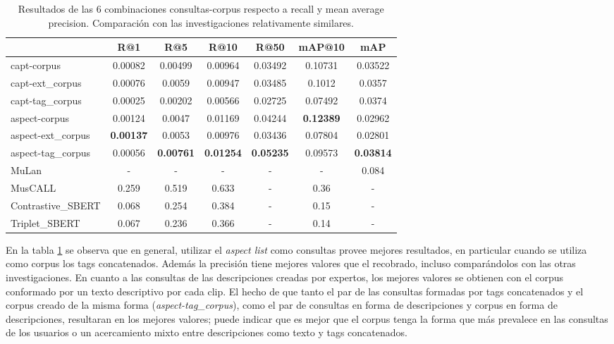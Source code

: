 \begin{table}[h]
    \footnotesize
    \centering
    \begin{tabular} { | l | c | c | c | c | c | c | }
    \hline
                      &   R@1           &   R@5   &   R@10          &   R@50          & mAP@10          &   mAP   \\ 
    \hline
    capt-corpus       & 0.00082         & 0.00499 & 0.00964         & 0.03492         & 0.10731         & 0.03522 \\
    capt-ext\_corpus   & 0.00076         & 0.0059  & 0.00947         & 0.03485         & 0.1012          & 0.0357  \\ 
    capt-tag\_corpus   & 0.00025         & 0.00202 & 0.00566         & 0.02725         & 0.07492         & 0.0374  \\ 
    aspect-corpus     & 0.00124         & 0.0047  & 0.01169         & 0.04244         &\textbf{0.12389} & 0.02962 \\ 
    aspect-ext\_corpus &\textbf{0.00137} & 0.0053  & 0.00976         & 0.03436         & 0.07804         & 0.02801 \\ 
    aspect-tag\_corpus & 0.00056 &\textbf{0.00761} &\textbf{0.01254} &\textbf{0.05235} & 0.09573 &\textbf{0.03814} \\ 
    \hline
MuLan \cite{Huang2022MuLanAJ}&    -     &    -    &         -       &        -        &        -        & 0.084   \\ 
MusCALL \cite{Manco2022ContrastiveAL}&  0.259  &  0.519  &  0.633   &        -        &  0.36           &   -     \\ 
Contrastive\_SBERT \cite{Doh2022TowardUT}& 0.068&  0.254  &  0.384   &        -        &  0.15           &   -     \\ 
Triplet\_SBERT \cite{Doh2022TowardUT} &  0.067  &  0.236  &  0.366   &        -        &  0.14           &   -     \\ 
    \hline
    \end{tabular}
    \caption{Resultados de las 6 combinaciones consultas-corpus	respecto a recall y mean average precision. Comparación con las     investigaciones relativamente similares.}
    \label{tab:results}
\end{table}

En la tabla \ref{tab:results} se observa que en general, utilizar el \textit{aspect list} como consultas provee mejores resultados, en particular cuando se utiliza como corpus los tags concatenados. Además la precisión tiene mejores valores que el recobrado, incluso comparándolos con las otras investigaciones.
En cuanto a las consultas de las descripciones creadas por expertos, los mejores valores se obtienen con el corpus conformado por un texto descriptivo por cada clip. El hecho de que tanto el par de las consultas formadas por tags concatenados y el corpus creado de la misma forma (\textit{aspect-tag\_corpus}), como el par de consultas en forma de descripciones y corpus en forma de descripciones, resultaran en los mejores valores; puede indicar que es mejor que el corpus tenga la forma que más prevalece en las consultas de los usuarios o un acercamiento mixto entre descripciones como texto y tags concatenados.

